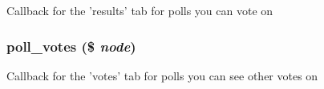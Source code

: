 Callback for the 'results' tab for polls you can vote on \hypertarget{poll_8pages_8inc_ba05cafb193346dcc10f8add20b7a372}{
\subsubsection[{poll\_\-votes}]{\setlength{\rightskip}{0pt plus 5cm}poll\_\-votes (\$ {\em node})}}
\label{poll_8pages_8inc_ba05cafb193346dcc10f8add20b7a372}


Callback for the 'votes' tab for polls you can see other votes on 